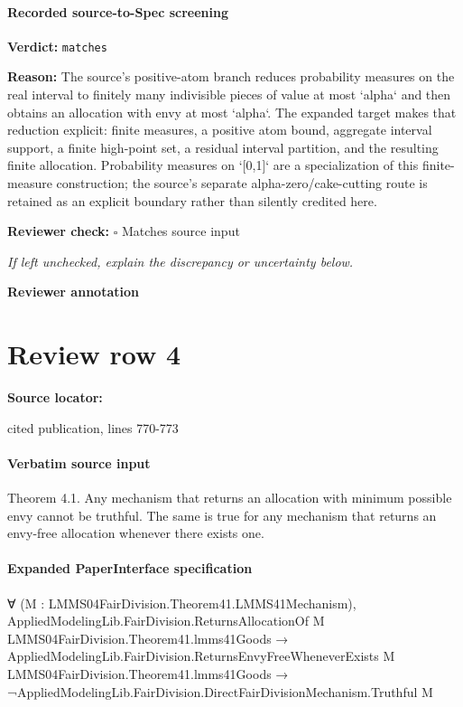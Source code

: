 \documentclass[10pt]{article}
\newcommand{\reviewerbox}{%
  \par\noindent\fbox{\parbox{0.96\linewidth}{\rule{0pt}{0.38in}}}\par
}
\newcommand{\reviewmatch}[1]{%
  \par\noindent\textbf{Reviewer check:} $\square$\; #1\par
  \noindent\emph{If left unchecked, explain the discrepancy or uncertainty below.}\par
}
\begin{document}
\paragraph{Recorded source-to-Spec screening}
\textbf{Verdict:} \texttt{matches}
\\
{\raggedright
\textbf{Reason:} The source's positive-\allowbreak{}atom branch reduces probability measures on the real interval to finitely many indivisible pieces of value at most `alpha` and then obtains an allocation with envy at most `alpha`.\allowbreak{} The expanded target makes that reduction explicit:\allowbreak{} finite measures, a positive atom bound, aggregate interval support, a finite high-\allowbreak{}point set, a residual interval partition, and the resulting finite allocation.\allowbreak{} Probability measures on `[0,1]` are a specialization of this finite-\allowbreak{}measure construction;\allowbreak{} the source's separate alpha-\allowbreak{}zero/\allowbreak{}cake-\allowbreak{}cutting route is retained as an explicit boundary rather than silently credited here.\allowbreak{}
\par}
\reviewmatch{Matches source input}
\noindent\textbf{Reviewer annotation}\par
\reviewerbox
\clearpage
\hypertarget{source-claim-87600c3a3d619cbf}{}
\section*{Review row 4}
\textbf{Source locator:} {\footnotesize\raggedright cited publication, lines 770-\allowbreak{}773\par}
\paragraph{Verbatim source input}
\begin{ReviewVerbatim}
Theorem 4.1. Any mechanism that returns an allocation
with minimum possible envy cannot be truthful. The same is
true for any mechanism that returns an envy-free allocation
whenever there exists one.
\end{ReviewVerbatim}



\paragraph{Expanded PaperInterface specification}
\begin{ReviewVerbatim}
∀ (M : LMMS04FairDivision.Theorem41.LMMS41Mechanism),
  AppliedModelingLib.FairDivision.ReturnsAllocationOf M LMMS04FairDivision.Theorem41.lmms41Goods →
    AppliedModelingLib.FairDivision.ReturnsEnvyFreeWheneverExists M LMMS04FairDivision.Theorem41.lmms41Goods →
      ¬AppliedModelingLib.FairDivision.DirectFairDivisionMechanism.Truthful M
\end{ReviewVerbatim}
\end{document}
